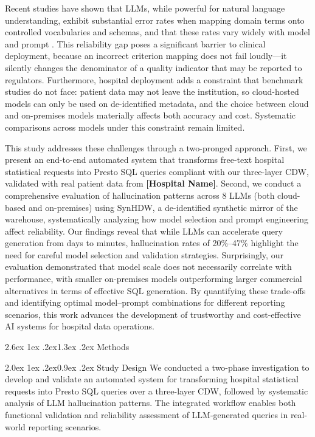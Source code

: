 \documentclass[10pt,twocolumn]{article}
\makeatletter
\renewcommand\section{\@startsection{section}{1}{\z@}%
  {2.6ex \@plus 1ex \@minus .2ex}{1.3ex \@plus .2ex}%
  {\normalfont\large\bfseries}}
\renewcommand\subsection{\@startsection{subsection}{2}{\z@}%
  {2.0ex \@plus 1ex \@minus .2ex}{0.9ex \@plus .2ex}%
  {\normalfont\normalsize\bfseries}}
\newcommand{\PH}[1]{{\color{red}\textbf{[#1]}}}
\makeatother
\begin{document}
Recent studies have shown that LLMs, while powerful for natural language
understanding, exhibit substantial error rates when mapping domain terms onto
controlled vocabularies and schemas, and that these rates vary widely with model
and prompt \cite{halluc2024,ragstruct2024,chang2024}. This reliability gap poses a significant barrier to
clinical deployment, because an incorrect criterion mapping does not fail
loudly---it silently changes the denominator of a quality indicator that may be
reported to regulators. Furthermore, hospital deployment adds a constraint that
benchmark studies do not face: patient data may not leave the institution, so
cloud-hosted models can only be used on de-identified metadata, and the choice
between cloud and on-premises models materially affects both accuracy and cost.
Systematic comparisons across models under this constraint remain limited.

This study addresses these challenges through a two-pronged approach. First, we
present an end-to-end automated system that transforms free-text hospital
statistical requests into Presto SQL queries compliant with our three-layer CDW,
validated with real patient data from \PH{Hospital Name}. Second, we conduct a
comprehensive evaluation of hallucination patterns across 8 LLMs (both
cloud-based and on-premises) using SynHDW, a de-identified synthetic mirror of
the warehouse, systematically analyzing how model selection and prompt
engineering affect reliability. Our findings reveal that while LLMs can
accelerate query generation from days to minutes, hallucination rates of
20\%--47\% highlight the need for careful model selection and validation
strategies. Surprisingly, our evaluation demonstrated that model scale does not
necessarily correlate with performance, with smaller on-premises models
outperforming larger commercial alternatives in terms of effective SQL
generation. By quantifying these trade-offs and identifying optimal
model--prompt combinations for different reporting scenarios, this work advances
the development of trustworthy and cost-effective AI systems for hospital data
operations.

\section{Methods}

\subsection{Study Design}
We conducted a two-phase investigation to develop and validate an automated
system for transforming hospital statistical requests into Presto SQL queries
over a three-layer CDW, followed by systematic analysis of LLM hallucination
patterns. The integrated workflow enables both functional validation and
reliability assessment of LLM-generated queries in real-world reporting
scenarios.
\end{document}
